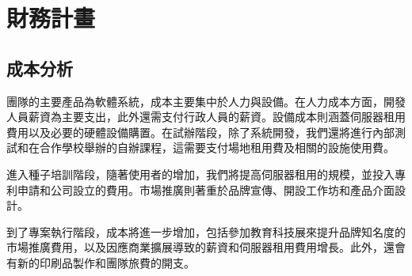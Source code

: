 \section{財務計畫}

\subsection{成本分析}

團隊的主要產品為軟體系統，成本主要集中於人力與設備。在人力成本方面，開發人員薪資為主要支出，此外還需支付行政人員的薪資。設備成本則涵蓋伺服器租用費用以及必要的硬體設備購置。在試辦階段，除了系統開發，我們還將進行內部測試和在合作學校舉辦的自辦課程，這需要支付場地租用費及相關的設施使用費。

進入種子培訓階段，隨著使用者的增加，我們將提高伺服器租用的規模，並投入專利申請和公司設立的費用。市場推廣則著重於品牌宣傳、開設工作坊和產品介面設計。

到了專案執行階段，成本將進一步增加，包括參加教育科技展來提升品牌知名度的市場推廣費用，以及因應商業擴展導致的薪資和伺服器租用費用增長。此外，還會有新的印刷品製作和團隊旅費的開支。

